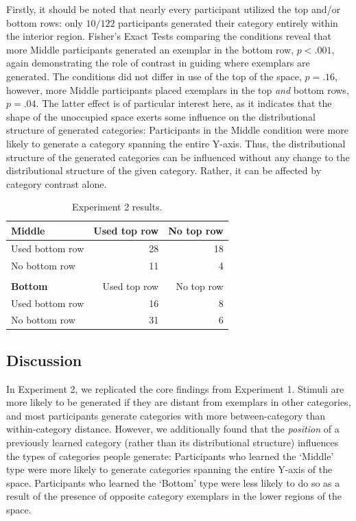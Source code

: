 \documentclass[12pt]{article}
\begin{document}
\begin{flushleft}
Firstly, it should be noted that nearly every participant utilized the top
and/or bottom rows: only $10 / 122$ participants generated their category
entirely within the interior region. Fisher's Exact Tests comparing the
conditions reveal that more Middle participants generated an exemplar in the
bottom row, $p < .001$, again demonstrating the role of contrast in guiding
where exemplars are generated. The conditions did not differ in use of the top
of the space, $p = .16$, however, more Middle participants placed exemplars in
the top {\em and} bottom rows, $p = .04$. The latter effect is of particular interest
here, as it indicates that the shape of the unoccupied space exerts some
influence on the distributional structure of generated categories: Participants
in the Middle condition were more likely to generate a category spanning the
entire Y-axis. Thus, the distributional structure of the generated categories
can be influenced without any change to the distributional structure of the
given category. Rather, it can be affected by category contrast alone.

\begin{table}
\begin{center}
\caption{Experiment 2 results.}
\label{table:e2-subset-table} \vskip 0.12in
\begin{tabular}{ l r r} \textbf{Middle} & Used top row & No top row \\ \hline
Used bottom row & 28 & 18 \\ No bottom row & 11 & 4 \\ \\ \textbf{Bottom} & Used
top row & No top row \\ \hline Used bottom row & 16 & 8 \\ No bottom row & 31 &
6 \\
\end{tabular}
\end{center}
\end{table}

\subsection{Discussion}

In Experiment 2, we replicated the core findings from Experiment 1. Stimuli are
more likely to be generated if they are distant from exemplars in other
categories, and most participants generate categories with more between-category
than within-category distance. However, we additionally found that the {\em
position} of a previously learned category (rather than its distributional
structure) influences the types of categories people generate: Participants who
learned the `Middle' type were more likely to generate categories spanning the
entire Y-axis of the space. Participants who learned the `Bottom' type were less
likely to do so as a result of the presence of opposite category exemplars in
the lower regions of the space.


\end{flushleft}
\end{document}
